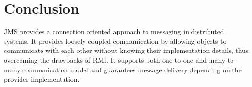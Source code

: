 \documentclass[9pt,twocolumn,twoside]{../../styles/osajnl}
\begin{document}
\section{Conclusion}
JMS provides a connection oriented approach to messaging in
distributed systems. It provides loosely coupled communication by
allowing objects to communicate with each other without knowing their
implementation details, thus overcoming the drawbacks of RMI. It
supports both one-to-one and many-to-many communication model and
guarantees message delivery depending on the provider implementation.




\end{document}
